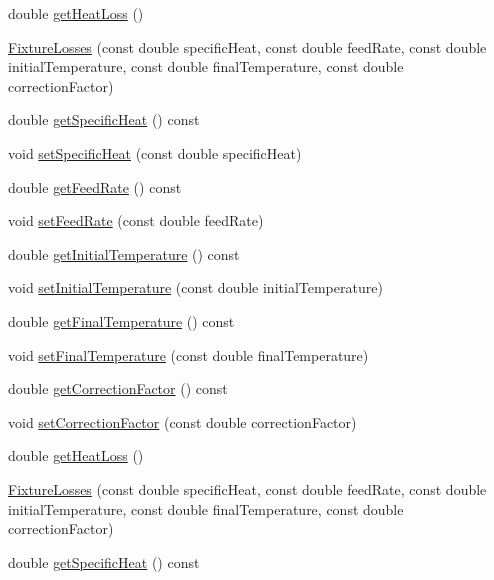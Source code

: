 \begin{DoxyCompactItemize}
\item 
double \hyperlink{class_fixture_losses_a6829840bdf0607d52adaa9b5ee6ded75}{get\+Heat\+Loss} ()
\item 
\hyperlink{class_fixture_losses_a97002e16f3f1be19983151cacec02f36}{Fixture\+Losses} (const double specific\+Heat, const double feed\+Rate, const double initial\+Temperature, const double final\+Temperature, const double correction\+Factor)
\item 
double \hyperlink{class_fixture_losses_adb3ea84a757bac31c52784cdd15349ea}{get\+Specific\+Heat} () const
\item 
void \hyperlink{class_fixture_losses_a946e4b6da1cca9f27e57f97688499ee1}{set\+Specific\+Heat} (const double specific\+Heat)
\item 
double \hyperlink{class_fixture_losses_a09707af8de4b304c65f4aeb1130ea44e}{get\+Feed\+Rate} () const
\item 
void \hyperlink{class_fixture_losses_a6543643db6b28f3a78397c97d9c5135f}{set\+Feed\+Rate} (const double feed\+Rate)
\item 
double \hyperlink{class_fixture_losses_aaa2e1042b71482b377e93d675909f78e}{get\+Initial\+Temperature} () const
\item 
void \hyperlink{class_fixture_losses_ad3f2a1013dc5da103f2bcfc1357a449b}{set\+Initial\+Temperature} (const double initial\+Temperature)
\item 
double \hyperlink{class_fixture_losses_a5c4259a78f78c675b063290f0fe6ea36}{get\+Final\+Temperature} () const
\item 
void \hyperlink{class_fixture_losses_a5b65e7118cb96c4f4c88c0d6d1a4f6d3}{set\+Final\+Temperature} (const double final\+Temperature)
\item 
double \hyperlink{class_fixture_losses_af643d715a8b1369efa586fa43e75c732}{get\+Correction\+Factor} () const
\item 
void \hyperlink{class_fixture_losses_a3a3dd839d71adb630e7ce76644f18098}{set\+Correction\+Factor} (const double correction\+Factor)
\item 
double \hyperlink{class_fixture_losses_a6829840bdf0607d52adaa9b5ee6ded75}{get\+Heat\+Loss} ()
\item 
\hyperlink{class_fixture_losses_a97002e16f3f1be19983151cacec02f36}{Fixture\+Losses} (const double specific\+Heat, const double feed\+Rate, const double initial\+Temperature, const double final\+Temperature, const double correction\+Factor)
\item 
double \hyperlink{class_fixture_losses_adb3ea84a757bac31c52784cdd15349ea}{get\+Specific\+Heat} () const

\end{DoxyCompactItemize}
